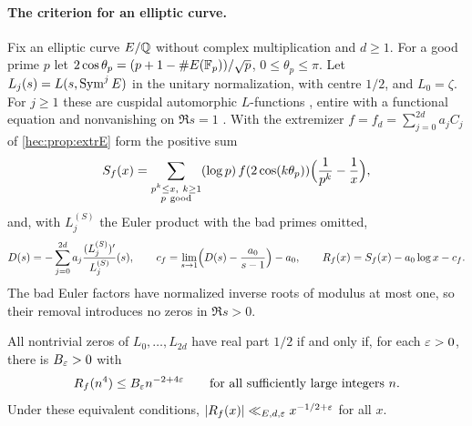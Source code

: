 \paragraph{The criterion for an elliptic curve.}
Fix an elliptic curve $E/\mathbb{Q}$ without complex multiplication and $d\ge1$. For a good prime $p$ let
$2\cos\theta_p=(p+1-\#E(\mathbb{F}_p))/\sqrt p$, $0\le\theta_p\le\pi$. Let $L_j(s)=L(s,\operatorname{Sym}^jE)$ in the unitary
normalization, with centre $1/2$, and $L_0=\zeta$. For $j\ge1$ these are cuspidal automorphic
$L$-functions \cite{NewtonThorne2021Symmetric}, entire with a functional equation and nonvanishing on
$\Re s=1$ \cite{JacquetShalika1976Nonvanishing}. With the extremizer $f=f_d=\sum_{j=0}^{2d}a_jC_j$ of
\cref{hec:prop:extrE} form the positive sum
\[
 S_f(x)=\sum_{\substack{p^k\le x,\ k\ge1\\p\ \mathrm{good}}}(\log p)\,f(2\cos(k\theta_p))
 \Bigl(\frac1{p^k}-\frac1x\Bigr),
\]
and, with $L_j^{(S)}$ the Euler product with the bad primes omitted,
\[
 D(s)=-\sum_{j=0}^{2d}a_j\frac{(L_j^{(S)})'}{L_j^{(S)}}(s),\qquad
 c_f=\lim_{s\to1}\Bigl(D(s)-\frac{a_0}{s-1}\Bigr)-a_0,\qquad
 R_f(x)=S_f(x)-a_0\log x-c_f .
\]
The bad Euler factors have normalized inverse roots of modulus at most one, so their removal introduces no
zeros in $\Re s>0$.

\begin{theorem}\label{hec:thm:symE}
All nontrivial zeros of $L_0,\dots,L_{2d}$ have real part $1/2$ if and only if, for each $\varepsilon>0$, there is
$B_\varepsilon>0$ with
\[
 R_f(n^4)\le B_\varepsilon n^{-2+4\varepsilon}\qquad\text{for all sufficiently large integers }n .
\]
Under these equivalent conditions, $\lvert R_f(x)\rvert\ll_{E,d,\varepsilon}x^{-1/2+\varepsilon}$ for all $x$.
\end{theorem}

